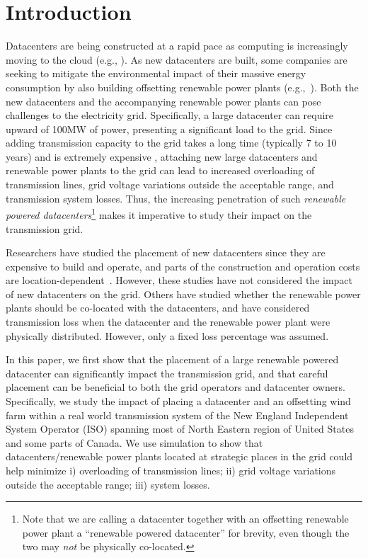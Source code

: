 \section{Introduction}
\label{sec:intro}

Datacenters are being constructed at a rapid pace as computing is increasingly moving to the cloud (e.g., \cite{RM14DCGrowth}).  As new datacenters are built, some companies are seeking to mitigate the environmental impact of their massive energy consumption by also building offsetting renewable power plants (e.g.,~\cite{GoogleGreen,Apple13,McGrawHill11}).  Both the new datacenters and the accompanying renewable power plants can pose challenges to the electricity grid.  Specifically, a large datacenter can require upward of 100MW of power, presenting a significant load to the grid.  Since adding transmission capacity to the grid takes a long time (typically 7 to 10 years) and is extremely expensive \cite{interconnection2010survey}, attaching new large datacenters and renewable power plants to the grid can lead to increased overloading of transmission lines, grid voltage variations outside the acceptable range, and transmission system losses.  Thus, the increasing penetration of such {\em renewable powered datacenters}\footnote{Note that we are calling a datacenter together with an offsetting renewable power plant a ``renewable powered datacenter'' for brevity, even though the two may {\em not} be physically co-located.} makes it imperative to study their impact on the transmission grid.

Researchers have studied the placement of new datacenters since they are expensive to build and operate, and parts of the construction and operation costs are location-dependent~\cite{Goiri11place,Dalger05,Boley09,larumbe2012optimal,berral2014building}.  However, these studies have not considered the impact of new datacenters on the grid.  Others have studied whether the renewable power plants should be co-located with the datacenters\cite{Ren12MASCOTS}, and have considered transmission loss when the datacenter and the renewable power plant were physically distributed.  However, only a fixed loss percentage was assumed.

In this paper, we first show that the placement of a large renewable powered datacenter can significantly impact the transmission grid, and that careful placement can be beneficial to both the grid operators and datacenter owners.  Specifically, we study the impact of placing a datacenter and an offsetting wind farm within a real world transmission system of the New England Independent System Operator (ISO) spanning most of North Eastern region of United States and some parts of Canada.  We use simulation to show that datacenters/renewable power plants located at strategic places in the grid could help minimize i) overloading of transmission lines; ii) grid voltage variations outside the acceptable range; iii) system losses.


